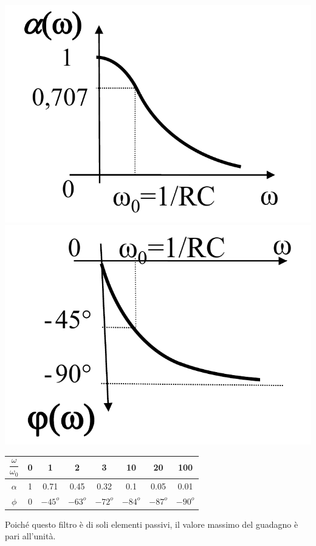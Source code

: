 \documentclass{article}
\begin{document}
\begin{center}
    \includegraphics[scale=0.27]{Image/Passa-basso_2.png}
    \includegraphics[scale=0.27]{Image/Passa-basso_3.png}
\end{center}
\begin{center}
    \begin{tabular}{|c|c|c|c|c|c|c|c|}
        \hline
        $\dfrac{\omega}{\omega_0}$
        & 0 & 1 & 2 & 3 & 10 & 20 & 100\\
        \hline
        $\alpha$ & 1 & 0.71 & 0.45 & 0.32 & 0.1 & 0.05 & 0.01\\
        \hline
        $\phi$ & 0 & $-45^o$ & $-63^o$ & $-72^o$ & $-84^o$ & $-87^o$ & $-90^o$\\
        \hline
    \end{tabular}
\end{center}
Poiché questo filtro è di soli elementi passivi, il
valore massimo del guadagno è pari all'unità.
\end{document}
